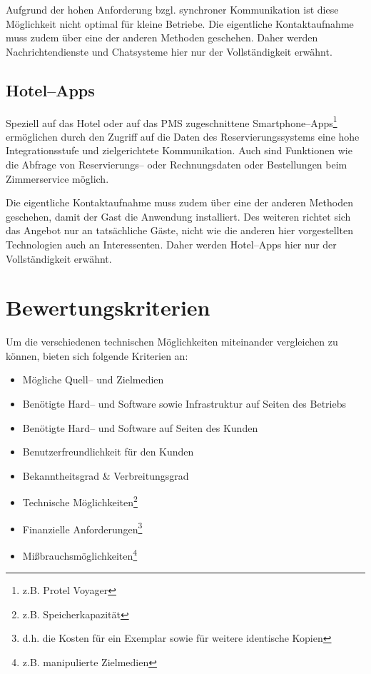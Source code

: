 Aufgrund der hohen Anforderung bzgl. synchroner Kommunikation ist diese Möglichkeit nicht optimal für kleine Betriebe. Die eigentliche Kontaktaufnahme muss zudem über eine der anderen Methoden geschehen. Daher werden Nachrichtendienste und Chatsysteme hier nur der Vollständigkeit erwähnt.

\subsection{Hotel--Apps} %
\label{sub:hotel_apps}
Speziell auf das Hotel oder auf das \ac{PMS} zugeschnittene Smartphone–Apps\footnote{z.B. Protel Voyager} ermöglichen durch den Zugriff auf die Daten des Reservierungssystems eine hohe Integrationsstufe und zielgerichtete Kommunikation. Auch sind Funktionen wie die Abfrage von Reservierungs– oder Rechnungsdaten oder Bestellungen beim Zimmerservice möglich.

Die eigentliche Kontaktaufnahme muss zudem über eine der anderen Methoden geschehen, damit der Gast die Anwendung installiert. Des  weiteren richtet sich das Angebot nur an tatsächliche Gäste, nicht wie die anderen hier vorgestellten Technologien auch an Interessenten. Daher werden Hotel–Apps hier nur der Vollständigkeit erwähnt.




\newpage
\section{Bewertungskriterien} %
\label{sec:kriterien}

Um die verschiedenen technischen Möglichkeiten miteinander vergleichen zu können, bieten sich folgende Kriterien an:

\begin{itemize}
\item Mögliche Quell– und Zielmedien
\item Benötigte Hard-- und Software sowie Infrastruktur auf Seiten des Betriebs
\item Benötigte Hard-- und Software auf Seiten des Kunden
\item Benutzerfreundlichkeit für den Kunden
\item Bekanntheitsgrad \& Verbreitungsgrad 
\item Technische Möglichkeiten\footnote{z.B. Speicherkapazität}
\item Finanzielle Anforderungen\footnote{d.h. die Kosten für ein Exemplar sowie für weitere identische Kopien}
\item Mißbrauchsmöglichkeiten\footnote{z.B. manipulierte Zielmedien}
\end{itemize}


